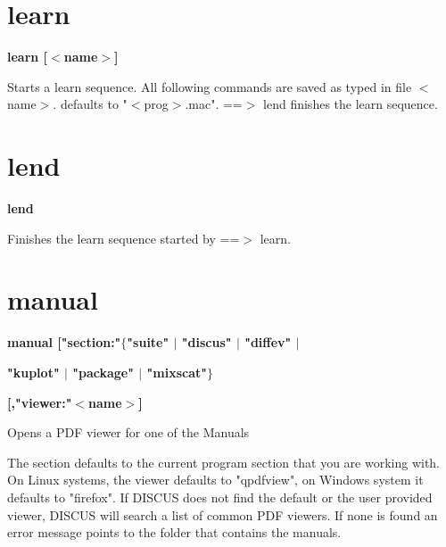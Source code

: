 \section{learn}
{\bf learn [$ <$name$> $] \par }
\par
\vspace{3pt}
Starts a learn sequence. All following commands are saved as typed 
in file $ <$name$> $. defaults to "$ <$prog$> $.mac". ==$> $ lend finishes the 
learn sequence. 
\section{lend}
{\bf lend \par }
\par
\vspace{3pt}
Finishes the learn sequence started by ==$> $ learn. 
\section{manual}
{\bf manual ["section:"$ \{$"suite"  $| $ "discus"  $| $ "diffev" $| $ \par }
{\bf                    "kuplot" $| $ "package" $| $ "mixscat"$\} $ \par }
{\bf        [,"viewer:"$ <$name$> $] \par }
\par
\vspace{3pt}
Opens a PDF viewer for one of the Manuals 
\par
The section defaults to the current program section that you are 
working with. 
On Linux systems, the viewer defaults to "qpdfview", on Windows 
system it defaults to "firefox". If DISCUS does not find the 
default or the user provided viewer, DISCUS will search 
a list of common PDF viewers. If none is found an error message 
points to the folder that contains the manuals. 
